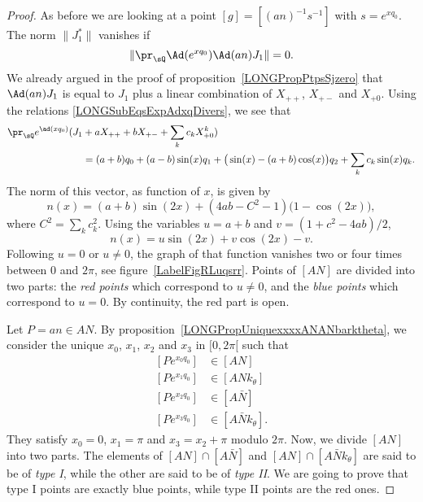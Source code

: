 \begin{proof}
	As before we are looking at a point $[g]=[(an)^{-1}s^{-1}]$ with $s= e^{xq_0}$. The norm $\| J_1^* \|$ vanishes if
	\begin{equation}
		\| \pr_{\sQ} \Ad( e^{xq_0})\Ad(an)J_1 \|=0.
	\end{equation}
	We already argued in the proof of proposition~\ref{LONGPropPtpsSjzero} that $\Ad(an)J_1$ is equal to $J_1$ plus a linear combination of $X_{++}$, $X_{+-}$ and $X_{+0}$. Using the relations \eqref{LONGSubEqsExpAdxqDivers}, we see that
	\begin{equation}        \label{LONGEqprQexpxqzXanroots}
		\begin{aligned}[]
			\pr_{\sQ} e^{\ad(xq_0)}(J_1 & +aX_{++}+bX_{+-}+\sum_k c_kX^k_{+0})                                                 \\
			                            & =(a+b)q_0+(a-b)\sin(x)q_1+\big( \sin(x)-(a+b)\cos(x) \big)q_2+\sum _k c_k\sin(x)q_k.
		\end{aligned}
	\end{equation}
	The norm of this vector, as function of $x$, is given by
	\begin{equation}
		n(x)=(a+b)\sin(2x)+(4ab-C^2-1)\big( 1-\cos(2x) \big),
	\end{equation}
	where $C^2=\sum_kc_k^2$. Using the variables $u=a+b$ and $v=(1+c^2-4ab)/2$,
	\begin{equation}
		n(x)=u\sin(2x)+v\cos(2x)-v.
	\end{equation}
	Following $u=0$ or $u\neq 0$, the graph of that function vanishes two or four times between $0$ and $2\pi$, see figure~\ref{LabelFigRLuqsrr}. Points of $[AN]$ are divided into two parts: the \emph{red points} which correspond to $u\neq 0$, and the \emph{blue points} which correspond to $u=0$. By continuity, the red part is open.


	\newcommand{\CaptionFigRLuqsrr}{In red, the function $n(x)$ with $u\neq 0$ and in blue, the function with $u=0$.}
	

	Let $P=an\in AN$.
	By proposition~\ref{LONGPropUniquexxxxANANbarktheta}, we consider the unique  $x_0$, $x_1$, $x_2$ and $x_3$ in $\mathopen[ 0 , 2\pi [$ such that
	\begin{subequations}
		\begin{align}
			[P e^{x_0q_0}] & \in[AN]                 \\
			[P e^{x_1q_0}] & \in[ANk_{\theta}]       \\
			[P e^{x_2q_0}] & \in[A\bar N]            \\
			[P e^{x_3q_0}] & \in[A\bar Nk_{\theta}].
		\end{align}
	\end{subequations}
	They satisfy $x_0=0$, $x_1=\pi$ and $x_3=x_2+\pi$ modulo $2\pi$. Now, we divide $[AN]$ into two parts. The elements of $[AN]\cap [A\bar N]$ and $[AN]\cap[A\bar Nk_{\theta}]$ are said to be of \emph{type I}, while the other are said to be of \emph{type II}. We are going to prove that type I points are exactly blue points, while type II points are the red ones.


\end{proof}

